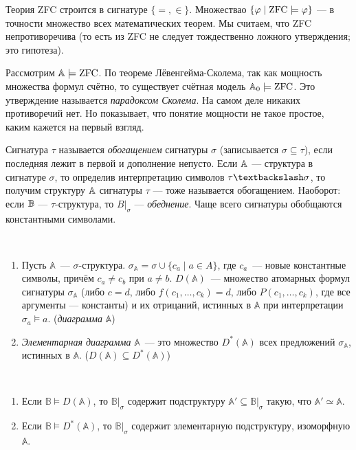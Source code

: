 \begin{remark}
    Теория ZFC строится в сигнатуре $\{=, \in\}$. Множествао $\set*{\vfi \mid \text{ZFC}\models \vfi}$ — в точности множество всех математических теорем. Мы считаем, что ZFC непротиворечива (то есть из ZFC не следует тождественно ложного утверждения; это гипотеза).

    Рассмотрим $\ba\models \text{ZFC}$. По теореме Лёвенгейма-Сколема, так как мощность множества формул счётно, то существует счётная модель $\ba_0\models \text{ZFC}$. Это утверждение называется \emph{парадоксом Сколема}. На самом деле никаких противоречий нет. Но показывает, что понятие мощности не такое простое, каким кажется на первый взгляд.
\end{remark}

Сигнатура $\tau$ называется \textit{обогащением} сигнатуры $\sigma$ (записывается $\sigma\subseteq\tau$), если последняя лежит в первой и дополнение непусто. Если $\ba$ — структура в сигнатуре $\sigma$, то определив интерпретацию символов $\tau\textbackslash\sigma$, то получим структуру $\ba$ сигнатуры $\tau$ — тоже называется обогащением. Наоборот: если $\bb$ — $\tau$-структура, то $B|_\sigma$ — \emph{обеднение}. Чаще всего сигнатуры обобщаются константными символами.

\begin{definition} \

    \begin{enumerate}
        \item Пусть $\mathbb{A}$~— $\sigma$-структура. $\sigma_{\mathbb{A}} = \sigma \cup \{c_a \mid a \in A\}$, где $c_a$~— новые константные символы, причём $c_a \neq c_b$ при $a \neq b$. $D(\mathbb{A})$~— множество атомарных формул сигнатуры $\sigma_{\mathbb{A}}$ (либо $c=d$, либо $f(c_1, \dots, c_k)=d$, либо $P(c_1, \dots, c_k)$, где все аргументы — константы) и их отрицаний, истинных в $\mathbb{A}$ при интерпретации $\sigma_a \models a$. (\textit{диаграмма} $\mathbb{A}$) 
        \item \textit{Элементарная диаграмма} $\mathbb{A}$~— это множество $D^*(\mathbb{A})$ всех предложений $\sigma_{\mathbb{A}}$, истинных в $\mathbb{A}$. ($D(\mathbb{A}) \subseteq D^*(\mathbb{A})$)
    \end{enumerate}
\end{definition}

\begin{stat} \ 
    \begin{enumerate}
        \item Если $\mathbb{B} \models D(\mathbb{A})$, то $\mathbb{B}|_{\sigma}$ содержит подструктуру $\mathbb{A}' \subseteq \mathbb{B}|_{\sigma}$ такую, что $\mathbb{A}' \simeq \mathbb{A}$. 
        \item Если $\mathbb{B} \models D^*(\mathbb{A})$, то $\mathbb{B}|_{\sigma}$ содержит элементарную подструктуру, изоморфную $\mathbb{A}$. 
    \end{enumerate}
\end{stat}

